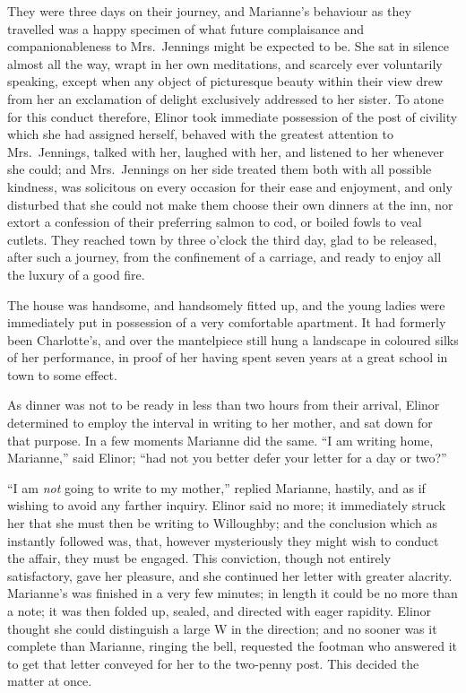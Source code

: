 \documentclass{article}
\begin{document}
They were three days on their journey, and Marianne's
behaviour as they travelled was a happy specimen of what
future complaisance and companionableness to Mrs.\ Jennings
might be expected to be.  She sat in silence almost all
the way, wrapt in her own meditations, and scarcely ever
voluntarily speaking, except when any object of picturesque
beauty within their view drew from her an exclamation
of delight exclusively addressed to her sister.  To atone
for this conduct therefore, Elinor took immediate possession
of the post of civility which she had assigned herself,
behaved with the greatest attention to Mrs.\ Jennings,
talked with her, laughed with her, and listened to her
whenever she could; and Mrs.\ Jennings on her side
treated them both with all possible kindness, was solicitous
on every occasion for their ease and enjoyment, and only
disturbed that she could not make them choose their own
dinners at the inn, nor extort a confession of their
preferring salmon to cod, or boiled fowls to veal cutlets.
They reached town by three o'clock the third day, glad to
be released, after such a journey, from the confinement
of a carriage, and ready to enjoy all the luxury of a good fire.

The house was handsome, and handsomely fitted up,
and the young ladies were immediately put in possession
of a very comfortable apartment.  It had formerly
been Charlotte's, and over the mantelpiece still hung
a landscape in coloured silks of her performance,
in proof of her having spent seven years at a great school
in town to some effect.

As dinner was not to be ready in less than two
hours from their arrival, Elinor determined to employ
the interval in writing to her mother, and sat down for
that purpose.  In a few moments Marianne did the same.
``I am writing home, Marianne,'' said Elinor; ``had not you
better defer your letter for a day or two?''

``I am \emph{not} going to write to my mother,''
replied Marianne, hastily, and as if wishing to avoid
any farther inquiry.  Elinor said no more; it immediately
struck her that she must then be writing to Willoughby;
and the conclusion which as instantly followed was,
that, however mysteriously they might wish to conduct
the affair, they must be engaged.  This conviction,
though not entirely satisfactory, gave her pleasure,
and she continued her letter with greater alacrity.
Marianne's was finished in a very few minutes;
in length it could be no more than a note; it was then
folded up, sealed, and directed with eager rapidity.
Elinor thought she could distinguish a large W in
the direction; and no sooner was it complete than Marianne,
ringing the bell, requested the footman who answered it
to get that letter conveyed for her to the two-penny post.
This decided the matter at once.
\end{document}
